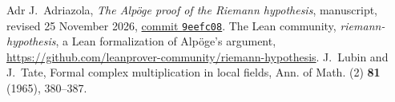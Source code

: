 \documentclass[reqno]{amsart}
\theoremstyle{definition}
\theoremstyle{plain}
\begin{document}
\begin{thebibliography}{Adr}
J.~Adriazola, \emph{The Alp\"oge proof of the Riemann hypothesis}, manuscript, revised 25 November 2026, \href{https://github.com/jimjamzola/RH-Alpoge-Reconstruction/tree/9eefc08b0819728d4dd2ef0568b49a61251af111}{commit \texttt{9eefc08}}.
 The Lean community, \emph{riemann-hypothesis}, a Lean formalization of Alp\"oge's argument, \url{https://github.com/leanprover-community/riemann-hypothesis}.
 J.~Lubin and J.~Tate, Formal complex multiplication in local fields, Ann. of Math. (2) \textbf{81} (1965), 380--387.
\end{thebibliography}
\end{document}

